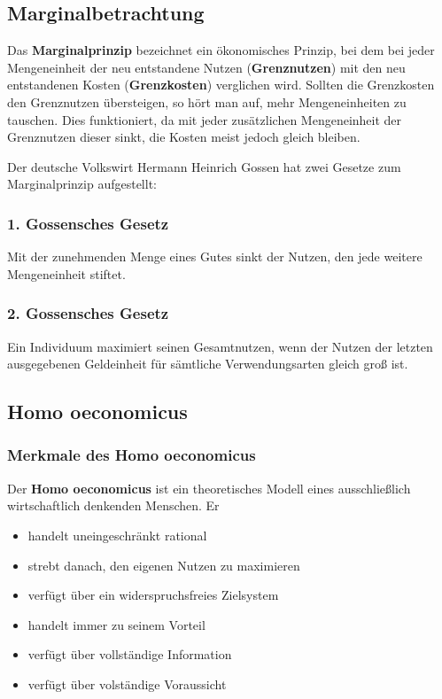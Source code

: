\documentclass[titlepage,parskip=half]{scrartcl}
\begin{document}
\subsection{Marginalbetrachtung}
Das \textbf{Marginalprinzip} bezeichnet ein ökonomisches Prinzip, bei dem bei jeder Mengeneinheit der neu entstandene Nutzen (\textbf{Grenznutzen}) mit den neu entstandenen Kosten (\textbf{Grenzkosten}) verglichen wird. Sollten die Grenzkosten den Grenznutzen übersteigen, so hört man auf, mehr Mengeneinheiten zu tauschen. Dies funktioniert, da mit jeder zusätzlichen Mengeneinheit der Grenznutzen dieser sinkt, die Kosten meist jedoch gleich bleiben.

Der deutsche Volkswirt Hermann Heinrich Gossen hat zwei Gesetze zum Marginalprinzip aufgestellt:

\subsubsection{1. Gossensches Gesetz}
Mit der zunehmenden Menge eines Gutes sinkt der Nutzen, den jede weitere Mengeneinheit stif\-tet.

\subsubsection{2. Gossensches Gesetz}
Ein Individuum maximiert seinen Gesamtnutzen, wenn der Nutzen der letzten ausgegebenen Geldeinheit für sämtliche Verwendungsarten gleich groß ist.


\subsection{Homo oeconomicus}

\subsubsection{Merkmale des Homo oeconomicus}
Der \textbf{Homo oeconomicus} ist ein theoretisches Modell eines ausschließlich wirtschaftlich denkenden Menschen. Er
\begin{itemize}
    \item handelt uneingeschränkt rational
    \item strebt danach, den eigenen Nutzen zu maximieren
    \item verfügt über ein widerspruchsfreies Zielsystem
    \item handelt immer zu seinem Vorteil
    \item verfügt über vollständige Information
    \item verfügt über volständige Voraussicht
\end{itemize}
\end{document}
